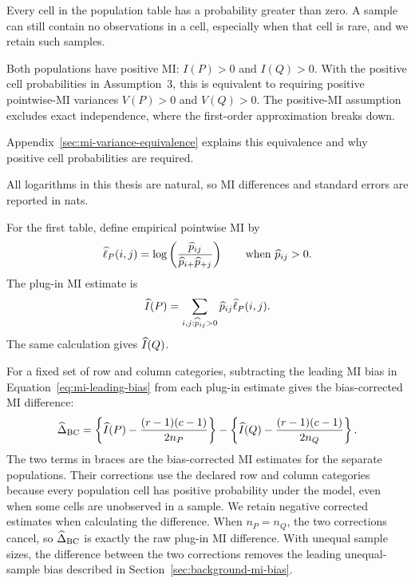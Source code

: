 \begin{assumption}
Every cell in the population table has a probability greater than zero. A
sample can still contain no observations in a cell, especially when that cell
is rare, and we retain such samples.
\end{assumption}

\begin{assumption}[Positive MI]
Both populations have positive MI: \(I(P)>0\) and \(I(Q)>0\). With the positive
cell probabilities in Assumption~3, this is equivalent to requiring positive
pointwise-MI variances \(V(P)>0\) and \(V(Q)>0\). The positive-MI
assumption excludes exact independence, where the first-order approximation
breaks down.
\end{assumption}

Appendix~\ref{sec:mi-variance-equivalence} explains this equivalence and
why positive cell probabilities are required.

All logarithms in this thesis are natural, so MI differences and standard
errors are reported in nats.

\medskip
{}

For the first table, define empirical pointwise MI by
\begin{equation}
  \widehat{\ell}_P(i,j)
  =\log\left(
  \frac{\widehat p_{ij}}
       {\widehat p_{i+}\widehat p_{+j}}
  \right)
  \qquad\text{when }\widehat p_{ij}>0.
  \label{eq:empirical-pmi}
\end{equation}
The plug-in MI estimate is
\begin{equation}
  \widehat I(P)
  =\sum_{i,j:\widehat p_{ij}>0}
  \widehat p_{ij}\widehat{\ell}_P(i,j).
  \label{eq:plugin-mi}
\end{equation}
The same calculation gives \(\widehat I(Q)\).

For a fixed set of row and column categories, subtracting the leading MI bias in
Equation~\eqref{eq:mi-leading-bias} \citep{miller1955,moddemeijer1989}
from each plug-in estimate gives the bias-corrected MI difference:
\begin{equation}
  \widehat\Delta_{\mathrm{BC}}
  =\left\{\widehat I(P)-\frac{(r-1)(c-1)}{2n_P}\right\}
  -\left\{\widehat I(Q)-\frac{(r-1)(c-1)}{2n_Q}\right\}.
  \label{eq:bias-corrected-difference}
\end{equation}
The two terms in braces are the bias-corrected MI estimates for the
separate populations. Their corrections use the declared row and column
categories because every population cell has positive probability under
the model, even when some cells are unobserved in a sample. We retain
negative corrected estimates when calculating the difference.
When \(n_P=n_Q\), the two corrections cancel, so \(\widehat\Delta_{\mathrm{BC}}\) is exactly
the raw plug-in MI difference. With unequal sample sizes, the difference
between the two corrections removes the leading unequal-sample bias described in
Section~\ref{sec:background-mi-bias}.

